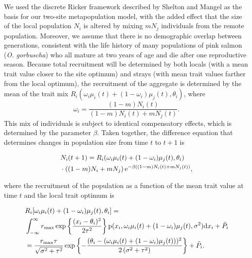 \documentclass{revtex4}
\begin{document}
We used the discrete Ricker framework described by Shelton and Mangel \citep{Shelton:2011eq} as the basis for our two-site metapopulation model, with the added effect that the size of the local population $N_i$ is altered by mixing $mN_j$ individuals from the remote population.
Moreover, we assume that there is no demographic overlap between generations, consistent with the life history of many populations of pink salmon (\emph{O. gorbuscha}) who all mature at two years of age and die after one reproductive season.
Because total recruitment will be determined by both locals (with a mean trait value closer to the site optimum) and strays (with mean trait values farther from the local optimum), the recruitment of the aggregate is determined by the mean of the trait mix $R_i(\omega_i\mu_i(t) + (1-\omega_i)\mu_j(t),\theta_i)$, where
\begin{equation}
\omega_i=\frac{(1-m)N_i(t)}{(1-m) N_i(t) + m N_j(t)}.
\end{equation}
This mix of individuals is subject to identical compensatory effects, which is determined by the parameter $\beta$.
Taken together, the difference equation that determines changes in population size from time $t$ to $t+1$ is

\begin{align}
  \label{eq:N}
  &N_i(t+1) = R_i(\omega_i\mu_i(t) + (1-\omega_i)\mu_j(t),\theta_i) \\ \nonumber
  &\cdot \left((1-m)N_i + mN_j\right){\rm e}^{-\beta ((1-m)N_i(t) + m N_j(t))},
\end{align}

\noindent where the recruitment of the population as a function of the mean trait value at time $t$ and the local trait optimum is

\begin{align}
  \label{eq:R}
  &R_i[\omega_i\mu_i(t) + (1-\omega_i)\mu_j(t),\theta_i] = \\ \nonumber
  &\int_{-\infty}^\infty r_{\rm max}\exp\left\{\frac{(x_i-\theta_i)^2}{2\tau^2}\right\} {\rm p}(x_i,\omega_i\mu_i(t) + (1-\omega_i)\mu_j(t),\sigma^2) {\rm d}x_i +\tilde{P}_i\\ \nonumber
  &= \frac{r_{\rm max} \tau  }{\sqrt{\sigma ^2+\tau ^2}}\exp\left\{-\frac{(\theta_i-(\omega_i\mu_i(t) + (1-\omega_i)\mu_j(t)))^2}{2 \left(\sigma ^2+\tau ^2\right)}\right\} +\tilde{P}_i.
\end{align}
\end{document}
